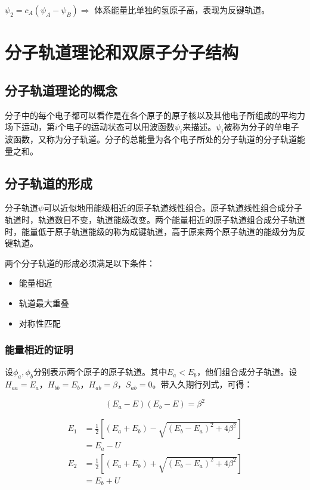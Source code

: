 $\psi_2 = c_A \left( \psi_A - \psi_B \right) \Rightarrow$ 体系能量比单独的氢原子高，表现为反键轨道。


\section{分子轨道理论和双原子分子结构}

\subsection{分子轨道理论的概念}


分子中的每个电子都可以看作是在各个原子的原子核以及其他电子所组成的平均力场下运动，第$i$个电子的运动状态可以用波函数$\psi_i$来描述。$\psi_i$被称为分子的单电子波函数，又称为分子轨道。分子的总能量为各个电子所处的分子轨道的分子轨道能量之和。


\subsection{分子轨道的形成}

分子轨道$\psi$可以近似地用能级相近的原子轨道线性组合。原子轨道线性组合成分子轨道时，轨道数目不变，轨道能级改变。两个能量相近的原子轨道组合成分子轨道时，能量低于原子轨道能级的称为成键轨道，高于原来两个原子轨道的能级分为反键轨道。

两个分子轨道的形成必须满足以下条件：

\begin{itemize}
	\item 能量相近
	\item 轨道最大重叠
	\item 对称性匹配
\end{itemize}


\subsubsection{能量相近的证明}

设$\phi_a, \phi_b$分别表示两个原子的原子轨道。其中$E_a < E_b$，他们组合成分子轨道。设$H_{aa} = E_a$，$H_{bb} = E_b$，$H_{ab} = \beta$，$S_{ab} = 0$。带入久期行列式，可得：

\begin{equation*}
	(E_a - E)(E_b - E) = \beta^2
\end{equation*}

\begin{align*}
	E_1 & = \frac{1}{2} \left[ (E_a + E_b) - \sqrt{\left(  E_b - E_a \right)^2 + 4\beta^2}  \right] \\
	    & = E_a - U
\end{align*}
\begin{align*}
	E_2 & = \frac{1}{2} \left[ (E_a + E_b) + \sqrt{\left(  E_b - E_a \right)^2 + 4\beta^2}  \right] \\
	    & = E_b + U
\end{align*}

